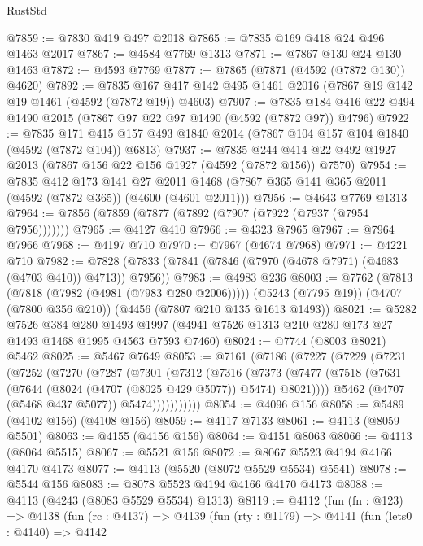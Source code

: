 \begin{lexlean}{RustStd}
\begin{coremodule}
@7859 := @7830 @419 @497 @2018
@7865 := @7835 @169 @418 @24 @496 @1463 @2017
@7867 := @4584 @7769 @1313
@7871 := @7867 @130 @24 @130 @1463
@7872 := @4593 @7769
@7877 := @7865 (@7871 (@4592 (@7872 @130)) @4620)
@7892 := @7835 @167 @417 @142 @495 @1461 @2016 (@7867 @19 @142 @19 @1461 (@4592 (@7872 @19)) @4603)
@7907 := @7835 @184 @416 @22 @494 @1490 @2015 (@7867 @97 @22 @97 @1490 (@4592 (@7872 @97)) @4796)
@7922 := @7835
    @171
    @415
    @157
    @493
    @1840
    @2014
    (@7867 @104 @157 @104 @1840 (@4592 (@7872 @104)) @6813)
@7937 := @7835 @244 @414 @22 @492 @1927 @2013 (@7867 @156 @22 @156 @1927 (@4592 (@7872 @156)) @7570)
@7954 := @7835
    @412
    @173
    @141
    @27
    @2011
    @1468
    (@7867 @365 @141 @365 @2011 (@4592 (@7872 @365)) (@4600 (@4601 @2011)))
@7956 := @4643 @7769 @1313
@7964 := @7856 (@7859 (@7877 (@7892 (@7907 (@7922 (@7937 (@7954 @7956)))))))
@7965 := @4127 @410
@7966 := @4323 @7965
@7967 := @7964 @7966
@7968 := @4197 @710
@7970 := @7967 (@4674 @7968)
@7971 := @4221 @710
@7982 := @7828 (@7833 (@7841 (@7846 (@7970 (@4678 @7971) (@4683 (@4703 @410)) @4713)) @7956))
@7983 := @4983 @236
@8003 := @7762
    (@7813 (@7818 (@7982 (@4981 (@7983 @280 @2006)))))
    (@5243 (@7795 @19))
    (@4707 (@7800 @356 @210))
    (@4456 (@7807 @210 @135 @1613 @1493))
@8021 := @5282
    @7526
    @384
    @280
    @1493
    @1997
    (@4941 @7526 @1313 @210 @280 @173 @27 @1493 @1468 @1995 @4563 @7593 @7460)
@8024 := @7744 (@8003 @8021) @5462
@8025 := @5467 @7649
@8053 := @7161
    (@7186
      (@7227
        (@7229
          (@7231
            (@7252
              (@7270
                (@7287
                  (@7301
                    (@7312
                      (@7316
                        (@7373
                          (@7477
                            (@7518 (@7631 (@7644 (@8024 (@4707 (@8025 @429 @5077)) @5474) @8021))))
                          @5462
                          (@4707 (@5468 @437 @5077))
                          @5474)))))))))))
@8054 := @4096 @156
@8058 := @5489 (@4102 @156) (@4108 @156)
@8059 := @4117 @7133
@8061 := @4113 (@8059 @5501)
@8063 := @4155 (@4156 @156)
@8064 := @4151 @8063
@8066 := @4113 (@8064 @5515)
@8067 := @5521 @156
@8072 := @8067 @5523 @4194 @4166 @4170 @4173
@8077 := @4113 (@5520 (@8072 @5529 @5534) @5541)
@8078 := @5544 @156
@8083 := @8078 @5523 @4194 @4166 @4170 @4173
@8088 := @4113 (@4243 (@8083 @5529 @5534) @1313)
@8119 := @4112
    (fun (fn : @123) =>
    @4138
      (fun (rc : @4137) =>
      @4139
        (fun (rty : @1179) =>
        @4141
          (fun (lets0 : @4140) =>
          @4142

\end{coremodule}
\end{lexlean}
